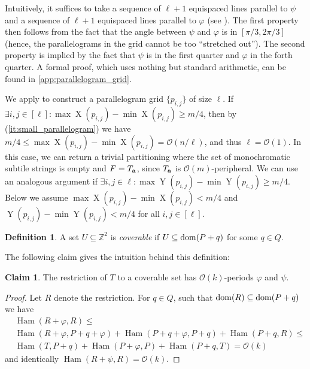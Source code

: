 \documentclass[11pt, letterpaper]{article}
\theoremstyle{plain}
\theoremstyle{definition}
\newtheorem{definition}{Definition}
\newtheorem{claim}{Claim}
\theoremstyle{remark}
\newcommand{\Z}{\mathbb{Z}}
\renewcommand{\O}{\mathcal{O}}
\renewcommand{\phi}{\varphi}
\DeclareMathOperator*{\X}{X}
\DeclareMathOperator*{\Y}{Y}
\DeclareMathOperator*{\Ham}{Ham}
\begin{document}

Intuitively, it suffices to take a sequence of $\ell+1$ equispaced lines parallel to $\psi$ and a sequence of $\ell+1$ equispaced lines parallel to $\phi$ (see ). The first property then follows from the fact that the angle between $\psi$ and $\varphi$ is in $[\pi/3,2\pi/3]$ (hence, the parallelograms in the grid cannot be too ``stretched out''). The second property is implied by the fact that $\psi$ is in the first quarter and $\phi$ in the forth quarter. A formal proof, which uses nothing but standard arithmetic, can be found in \cref{app:parallelogram_grid}.  

We apply  to construct a parallelogram grid $\{p_{i,j}\}$ of size $\ell$. If $\exists i, j \in [\ell] : \max \X(p_{i, j}) - \min \X(p_{i, j}) \ge m / 4$, then by  (\ref{it:small_parallelogram}) we have $m / 4 \le \max \X(p_{i, j}) - \min \X(p_{i, j}) = \O(n / \ell)$, and thus $\ell = \O(1)$. In this case, we can return a trivial partitioning where the set of monochromatic subtile strings is empty and $F = T_\mathbf{a}$, since $T_\mathbf{a}$ is $\O(m)$-peripheral. We can use an analogous argument if $\exists i,j \in \ell : \max \Y(p_{i, j}) - \min \Y(p_{i, j}) \ge m / 4$. Below we assume $\max \X(p_{i, j}) - \min \X(p_{i, j}) < m / 4$ and $\Y(p_{i, j}) - \min \Y(p_{i, j}) < m / 4$ for all $i, j \in [\ell]$. 

\begin{definition}
A set $U \subseteq \Z^2$ is \emph{coverable} if $U \subseteq \operatorname*{dom}(P + q)$ for some $q \in Q$.
\end{definition}

The following claim gives the intuition behind this definition:

\begin{claim}\label{coverable is periodic}
	The restriction of $T$ to a coverable set has $\O(k)$-periods $\phi$ and $\psi$.
\end{claim}	
	\begin{proof}
		Let $R$ denote the restriction. For $q \in Q$, such that $\operatorname*{dom}(R) \subseteq \operatorname*{dom}(P + q)$ we have
\begin{align*}
&\Ham(R + \phi, R) \le \\
&\Ham(R + \phi, P + q + \phi) + \Ham(P + q + \phi, P + q) + \Ham(P + q, R) \le \\
&\Ham(T, P + q) + \Ham(P + \phi, P) + \Ham(P + q, T) = \O(k)
\end{align*}
and identically $\Ham(R + \psi, R) = \O(k)$.
\end{proof}
\end{document}
